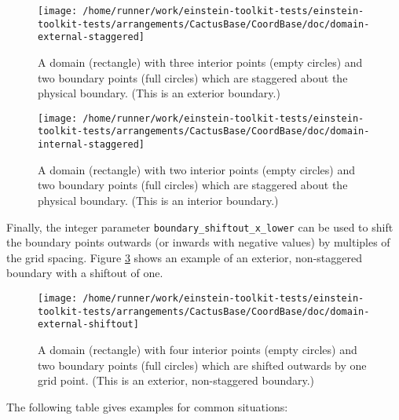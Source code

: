 \begin{figure}
\begin{center}
\texttt{[image: /home/runner/work/einstein-toolkit-tests/einstein-toolkit-tests/arrangements/CactusBase/CoordBase/doc/domain-external-staggered]}
\end{center}
\caption{A domain (rectangle) with three interior points (empty circles)
and two boundary points (full circles) which are staggered about the
physical boundary.  (This is an exterior boundary.)}
\label{CactusBase:CoordBase:fig-domain-external-staggered}
\end{figure}

\begin{figure}
\begin{center}
\texttt{[image: /home/runner/work/einstein-toolkit-tests/einstein-toolkit-tests/arrangements/CactusBase/CoordBase/doc/domain-internal-staggered]}
\end{center}
\caption{A domain (rectangle) with two interior points (empty circles)
and two boundary points (full circles) which are staggered about the
physical boundary.  (This is an interior boundary.)}
\label{CactusBase:CoordBase:fig-domain-internal-staggered}
\end{figure}

Finally, the integer parameter {\texttt{boundary\_shiftout\_x\_lower}}
can be used to shift the boundary points outwards (or inwards with
negative values) by multiples of the grid spacing.  Figure
{\ref{CactusBase:CoordBase:fig-domain-external-shiftout}} shows an
example of an exterior, non-staggered boundary with a shiftout of one.

\begin{figure}
\begin{center}
\texttt{[image: /home/runner/work/einstein-toolkit-tests/einstein-toolkit-tests/arrangements/CactusBase/CoordBase/doc/domain-external-shiftout]}
\end{center}
\caption{A domain (rectangle) with four interior points (empty circles)
and two boundary points (full circles) which are shifted outwards by
one grid point.  (This is an exterior, non-staggered boundary.)}
\label{CactusBase:CoordBase:fig-domain-external-shiftout}
\end{figure}

The following table gives examples for common situations:

